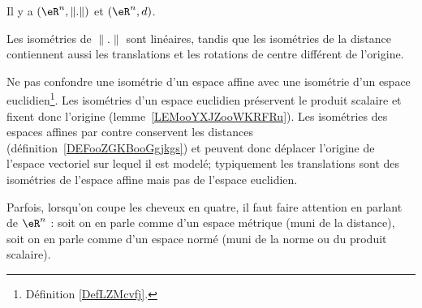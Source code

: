       \label{THMooVUCLooCrdbxm}

Il y a \( (\eR^n,\| . \|)\) et \( (\eR^n,d)\).

Les isométries de \( \| . \|\) sont linéaires, tandis que les isométries de la distance contiennent aussi les translations et les rotations de centre différent de l'origine.

Ne pas confondre une isométrie d'un espace affine avec une isométrie d'un espace euclidien\footnote{Définition \ref{DefLZMcvfj}.}. Les isométries d'un espace euclidien préservent le produit scalaire et fixent donc l'origine (lemme~\ref{LEMooYXJZooWKRFRu}). Les isométries des espaces affines par contre conservent les distances (définition~\ref{DEFooZGKBooGgjkgs}) et peuvent donc déplacer l'origine de l'espace vectoriel sur lequel il est modelé; typiquement les translations sont des isométries de l'espace affine mais pas de l'espace euclidien.

Parfois, lorsqu'on coupe les cheveux en quatre, il faut faire attention en parlant de \( \eR^n\) : soit on en parle comme d'un espace métrique (muni de la distance), soit on en parle comme d'un espace normé (muni de la norme ou du produit scalaire).

